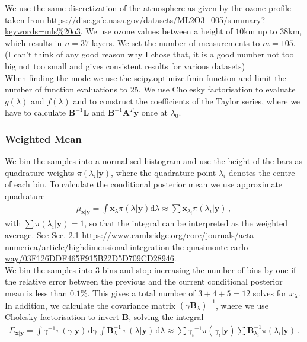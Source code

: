 We use the same discretization of the atmosphere as given by the ozone profile taken from \cite{MLSdata} \url{https://disc.gsfc.nasa.gov/datasets/ML2O3_005/summary?keywords=mls%20o3}.
We use ozone values between a height of $10$km up to $38$km, which results in $n=37$ layers.
We set the number of measurements to $m= 105 $.
(I can't think of any good reason why I chose that, it is a good number not too big not too small and gives consistent results for various datasets)\\

When finding the mode we use the scipy.optimize.fmin function and limit the number of function evaluations to 25.
We use Cholesky factorisation to evaluate $g(\lambda)$ and $f(\lambda)$ and to construct the coefficients of the Taylor series, where we have to calculate  $\bm{B}^{-1} \bm{L} $ and  $\bm{B}^{-1}  \bm{A}^T \bm{y}$ once at $\lambda_0$.\\

\subsubsection{Weighted Mean}
We bin the samples into a normalised histogram and use the height of the bars as quadrature weights $\pi(\lambda_i| \bm{y})$, where the quadrature point $\lambda_i$ denotes the centre of each bin.
To calculate the conditional posterior mean we use approximate quadrature
\begin{align}
	\mu_{\bm{x}|\bm{y}} = \int \bm{x}_{\lambda} \pi(\lambda| \bm{y}) \text{d}\lambda \approx \sum \bm{x}_{\lambda_i} \pi(\lambda_i| \bm{y}) \, ,
\end{align}
with $\sum \pi(\lambda_i| \bm{y}) = 1$, so that the integral can be interpreted as the weighted average.
See Sec. 2.1
\cite{Dick_Kuo_Sloan_2013} \url{https://www.cambridge.org/core/journals/acta-numerica/article/highdimensional-integration-the-quasimonte-carlo-way/03F126DDF465F915B22D5D709CD28946}.\\

We bin the samples into $3$ bins and stop increasing the number of bins by one if the relative error between the previous and the current conditional posterior mean is less than $0.1\%$.
This gives a total number of $3+4+5 = 12$ solves for $x_{\lambda}$.
In addition, we calculate the covariance matrix $(\gamma \bm{B}_{\lambda})^{-1} $, where we use Cholesky factorisation to invert $\bm{B}$, solving the integral
\begin{align}
	\Sigma_{\bm{x}|\bm{y}} = \int \gamma^{-1}  \pi(\gamma | \bm{y} ) \, \text{d} \gamma \, \int  \bm{B}_{\lambda}^{-1} \, \pi(\lambda | \bm{y} )  \, \text{d} \lambda  \approx \sum {\gamma_i}^{-1}\pi(\gamma_i| \bm{y}) \sum \bm{B}_{\lambda_i}^{-1}\pi(\lambda_i| \bm{y})\, .
\end{align}\\

